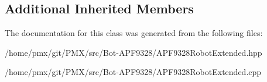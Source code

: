 \subsection*{Additional Inherited Members}


The documentation for this class was generated from the following files\+:\begin{DoxyCompactItemize}
\item 
/home/pmx/git/\+P\+M\+X/src/\+Bot-\/\+A\+P\+F9328/A\+P\+F9328\+Robot\+Extended.\+hpp\item 
/home/pmx/git/\+P\+M\+X/src/\+Bot-\/\+A\+P\+F9328/A\+P\+F9328\+Robot\+Extended.\+cpp\end{DoxyCompactItemize}
